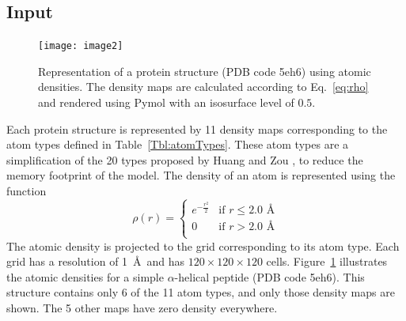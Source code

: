 \documentclass{bioinfo}
\begin{document}
\subsection{Input}
%
\begin{figure}[!tpb]
    \centering
    \centerline{\texttt{[image: image2]}}
%
    \caption{Representation of a protein structure (PDB code 5eh6)
    using atomic densities. The density maps are calculated according
    to Eq.~\ref{eq:rho} and rendered using Pymol \citep{PyMOL} with an
    isosurface level of $0.5$.}
%
    \label{Fig:atomic_densities}
\end{figure}
%
Each protein structure is represented by 11 density maps corresponding
to the atom types defined in Table~\ref{Tbl:atomTypes}. These atom
types are a simplification of the 20 types proposed by Huang and
Zou \citep{huang2006iterative, huang2008iterative}, to reduce the
memory footprint of the model.
The density of an atom is represented using the function
\begin{equation}
\label{eq:rho}
\rho(r) =  \begin{cases}
               e^{-\frac{r^2}{2}}&\text{if } r\leq 2.0\text{ \AA} \\
               0                 &\text{if } r>2.0\text{ \AA} \\
            \end{cases}
\end{equation}
The atomic density is projected to the grid corresponding to its atom
type. Each grid has a resolution of 1~\AA\ and has $120\times
120\times 120$ cells.
%
Figure~\ref{Fig:atomic_densities} illustrates the atomic densities for
a simple $\alpha$-helical peptide (PDB code 5eh6). This structure
contains only 6 of the 11 atom types, and only those density maps are
shown. The 5 other maps have zero density everywhere.
%
%
\end{document}

